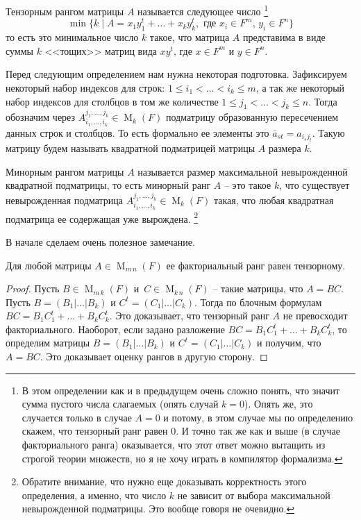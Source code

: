 \begin{definition}
\label{def::RkT}
Тензорным рангом матрицы $A$ называется следующее число%
\footnote{В этом определении как и в предыдущем очень сложно понять, что значит сумма пустого числа слагаемых (опять случай $k = 0$).
Опять же, это случается только в случае $A = 0$ и потому, в этом случае мы по определению скажем, что тензорный ранг равен $0$.
И точно так же как и выше (в случае факториального ранга) оказывается, что этот ответ можно вытащить из строгой теории множеств, но я не хочу играть в компилятор формализма.}
\[
\min\{k \mid A = x_1y_1^t+\ldots + x_k y_k^t,\text{ где }x_i\in F^m,\, y_i\in F^n\}
\]
то есть это минимальное число $k$ такое, что матрица $A$ представима в виде суммы $k$ <<тощих>> матриц вида $xy^t$, где $x\in F^m$ и $y\in F^n$.
\end{definition}


Перед следующим определением нам нужна некоторая подготовка.
Зафиксируем некоторый набор индексов для строк: $1\leqslant i_1<\ldots<i_k\leqslant m$, а так же некоторый набор индексов для столбцов в том же количестве $1\leqslant j_1<\ldots<j_k\leqslant n$.
Тогда обозначим через $A_{i_1,\ldots,i_k}^{j_1,\ldots,j_k}\in \operatorname{M}_k(F)$ подматрицу образованную пересечением данных строк и столбцов.
То есть формально ее элементы это $\bar a_{st} = a_{i_s j_t}$.
Такую матрицу будем называть квадратной подматрицей матрицы $A$ размера $k$.

\begin{definition}
\label{def::RkMin}
Минорным рангом матрицы $A$ называется размер максимальной невырожденной квадратной подматрицы, то есть минорный ранг $A$ -- это такое $k$, что существует невырожденная подматрица $A_{i_1,\ldots,i_k}^{j_1,\ldots,j_k}\in \operatorname{M}_k(F)$ такая, что любая квадратная подматрица ее содержащая уже вырождена.%
\footnote{Обратите внимание, что нужно еще доказывать корректность этого определения, а именно, что число $k$ не зависит от выбора максимальной невырожденной подматрицы.
Это вообще говоря не очевидно.}
\end{definition}

В начале сделаем очень полезное замечание.

\begin{claim}
\label{claim::rkFactorTensor}
Для любой матрицы $A\in \operatorname{M}_{m\,n}(F)$ ее факториальный ранг равен тензорному.
\end{claim}
\begin{proof}
Пусть $B\in \operatorname{M}_{m\,k}(F)$ и  $\,C\in\operatorname{M}_{k\,n}(F)$ -- такие матрицы, что $A = BC$.
Пусть $B = (B_1|\ldots|B_k)$ и $C^t = (C_1|\ldots|C_k)$.
Тогда по блочным формулам $BC = B_1 C_1^t + \ldots + B_kC_k^t$.
Это доказывает, что тензорный ранг $A$ не превосходит факториального.
Наоборот, если задано разложение $BC = B_1 C_1^t + \ldots + B_kC_k^t$, то определим матрицы $B = (B_1|\ldots|B_k)$ и $C^t = (C_1|\ldots|C_k)$ и получим, что $A = BC$.
Это доказывает оценку рангов в другую сторону.
\end{proof}

